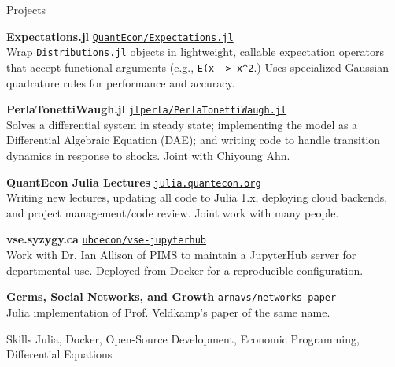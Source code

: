 \documentclass{resume} %
\begin{document}
\begin{rSection}{Projects}

{\bf Expectations.jl} \hfill {{ \href{https://github.com/QuantEcon/Expectations.jl}{\tt QuantEcon/Expectations.jl}}} \smallskip
\\ Wrap \texttt{Distributions.jl} objects in lightweight, callable expectation operators that accept functional arguments (e.g., \verb|E(x -> x^2|.) Uses specialized Gaussian quadrature rules for performance and accuracy. 

{\bf PerlaTonettiWaugh.jl} \hfill { \href{https://github.com/jlperla/PerlaTonettiWaugh.jl}{\tt jlperla/PerlaTonettiWaugh.jl}} \smallskip
\\ Solves a differential system in steady state; implementing the model as a Differential Algebraic Equation (DAE); and writing code to handle transition dynamics in response to shocks. Joint with Chiyoung Ahn. 

{\bf QuantEcon Julia Lectures} \hfill { \href{https://julia.quantecon.org}{\tt julia.quantecon.org}} \smallskip
\\ Writing new lectures, updating all code to Julia 1.x, deploying cloud backends, and project management/code review. Joint work with many people.

{\bf vse.syzygy.ca} \hfill { \href{https://github.com/ubcecon/vse-jupyterhub}{\tt ubcecon/vse-jupyterhub}} \smallskip
\\ Work with Dr. Ian Allison of PIMS to maintain a JupyterHub server for departmental use. Deployed from Docker for a reproducible configuration. 

{\bf Germs, Social Networks, and Growth} \hfill { \href{https://github.com/arnavs/networks-paper}{\tt arnavs/networks-paper}} \smallskip
\\ Julia implementation of Prof. Veldkamp's paper of the same name. 
\end{rSection}

\begin{rSection}{Skills}
Julia, Docker, Open-Source Development, Economic Programming, Differential Equations
\end{rSection}
\end{document}
